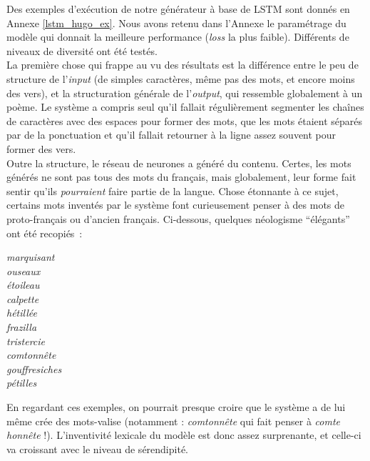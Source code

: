 \documentclass{article}
\newenvironment{citationbox}
{\begin{center}
		\begin{minipage}{.8\textwidth}
		}
		{
		\end{minipage}	
\end{center}
}
\begin{document}
					Des exemples d'exécution de notre générateur à base de LSTM sont donnés en Annexe \ref{lstm_hugo_ex}. Nous avons retenu dans l'Annexe le paramétrage du modèle qui donnait la meilleure performance (\textit{loss} la plus faible). Différents de niveaux de diversité ont été testés.\\
					
					La première chose qui frappe au vu des résultats est la différence entre le peu de structure de l'\textit{input} (de simples caractères, même pas des mots, et encore moins des vers), et la structuration générale de l'\textit{output}, qui ressemble globalement à un poème. Le système a compris seul qu'il fallait régulièrement segmenter les chaînes de caractères avec des espaces pour former des mots, que les mots étaient séparés par de la ponctuation et qu'il fallait retourner à la ligne assez souvent pour former des vers.\\
					
					Outre la structure, le réseau de neurones a généré du contenu. Certes, les mots générés ne sont pas tous des mots du français, mais globalement, leur forme fait sentir qu'ils \textit{pourraient} faire partie de la langue. Chose étonnante à ce sujet, certains mots inventés par le système font curieusement penser à des mots de proto-français ou d'ancien français. Ci-dessous, quelques néologisme ``élégants'' ont été recopiés~:
					\begin{citationbox}
						\textit{marquisant}\\
						\textit{ouseaux}\\
						\textit{étoileau}\\
						\textit{calpette}\\
						\textit{hétillée}\\
						\textit{frazilla}\\
						\textit{tristercie}\\
						\textit{comtonnête}\\
						\textit{gouffresiches}\\
						\textit{pétilles}\\
					\end{citationbox}
					En regardant ces exemples, on pourrait presque croire que le système a de lui même crée des mots-valise (notamment : \textit{comtonnête} qui fait penser à \textit{comte} \textit{honnête} !). L'inventivité lexicale du modèle est donc assez surprenante, et celle-ci va croissant avec le niveau de sérendipité.\\
					
\end{document}
